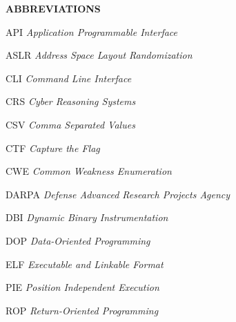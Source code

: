 \newenvironment{abbreviations}{\begin{list}{}{\renewcommand{\makelabel}{\abbrlabel}}}{\end{list}}
\newcommand{\abbrlabel}[1]{\makebox[3cm][l]{\textbf{#1}\ \dotfill}}

\begin{titlepage}
    \textbf{\large ABBREVIATIONS}\par
    \begin{abbreviations}
        \item[API] \textit{Application Programmable Interface}
        \item[ASLR] \textit{Address Space Layout Randomization}
        \item[CLI] \textit{Command Line Interface}
        \item[CRS] \textit{Cyber Reasoning Systems}
        \item[CSV] \textit{Comma Separated Values}
        \item[CTF] \textit{Capture the Flag}
        \item[CWE] \textit{Common Weakness Enumeration}
        \item[DARPA] \textit{Defense Advanced Research Projects Agency}
        \item[DBI] \textit{Dynamic Binary Instrumentation}
        \item[DOP] \textit{Data-Oriented Programming}
        \item[ELF] \textit{Executable and Linkable Format}
        \item[PIE] \textit{Position Independent Execution}
        \item[ROP] \textit{Return-Oriented Programming}
    \end{abbreviations}
\end{titlepage}